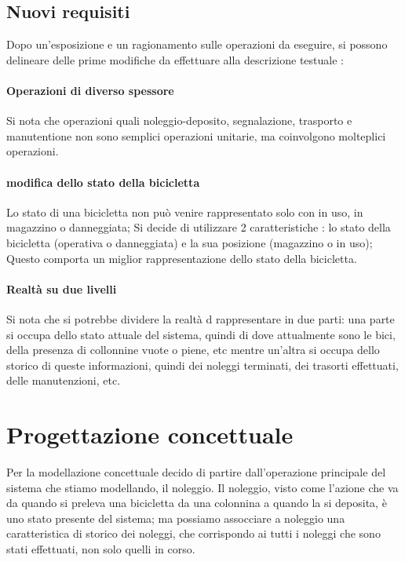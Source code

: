 \documentclass[a4paper,twoside]{article}
\begin{document}
\subsection{Nuovi requisiti}
Dopo un'esposizione e un ragionamento sulle operazioni da eseguire, si possono delineare delle prime modifiche da effettuare alla descrizione testuale :
\paragraph{Operazioni di diverso spessore} Si nota che operazioni quali noleggio-deposito, segnalazione, trasporto e manutentione non sono semplici operazioni unitarie, ma coinvolgono molteplici operazioni.
\paragraph{modifica dello stato della bicicletta} Lo stato di una bicicletta non può venire rappresentato solo con in uso, in magazzino o danneggiata; Si decide di utilizzare 2 caratteristiche : lo stato della bicicletta (operativa o danneggiata) e la sua posizione (magazzino o in uso); Questo comporta un miglior rappresentazione dello stato della bicicletta.
\paragraph{Realtà su due livelli} Si nota che si potrebbe dividere la realtà d rappresentare in due parti: una parte si occupa dello stato attuale del sistema, quindi di dove attualmente sono le bici, della presenza di collonnine vuote o piene, etc mentre un'altra si occupa dello storico di queste informazioni, quindi dei noleggi terminati, dei trasorti effettuati, delle manutenzioni, etc.

\section{Progettazione concettuale}
Per la modellazione concettuale decido di partire dall'operazione principale del sistema che stiamo modellando, il noleggio.
Il noleggio, visto come l'azione che va da quando si preleva una bicicletta da una colonnina a quando la si deposita, è uno stato presente del sistema; ma possiamo assocciare a noleggio una caratteristica di storico dei noleggi, che corrispondo ai tutti i noleggi che sono stati effettuati, non solo quelli in corso.
\end{document}
